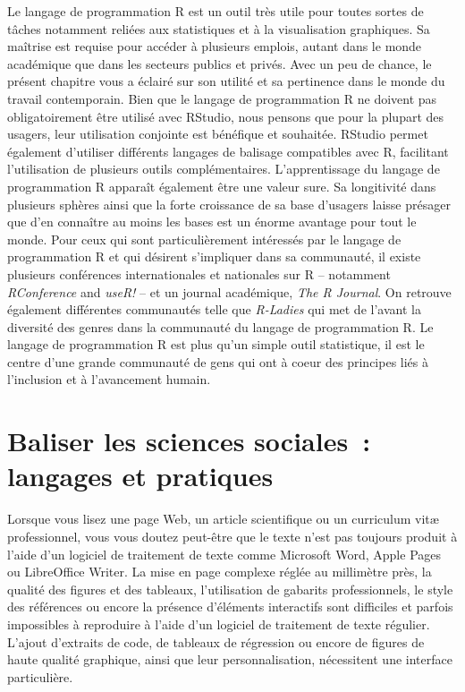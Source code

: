 \documentclass[
  letterpaper,
]{scrbook}
\begin{document}
Le langage de programmation R est un outil très utile pour toutes sortes
de tâches notamment reliées aux statistiques et à la visualisation
graphiques. Sa maîtrise est requise pour accéder à plusieurs emplois,
autant dans le monde académique que dans les secteurs publics et privés.
Avec un peu de chance, le présent chapitre vous a éclairé sur son
utilité et sa pertinence dans le monde du travail contemporain. Bien que
le langage de programmation R ne doivent pas obligatoirement être
utilisé avec RStudio, nous pensons que pour la plupart des usagers, leur
utilisation conjointe est bénéfique et souhaitée. RStudio permet
également d'utiliser différents langages de balisage compatibles avec R,
facilitant l'utilisation de plusieurs outils complémentaires.
L'apprentissage du langage de programmation R apparaît également être
une valeur sure. Sa longitivité dans plusieurs sphères ainsi que la
forte croissance de sa base d'usagers laisse présager que d'en connaître
au moins les bases est un énorme avantage pour tout le monde. Pour ceux
qui sont particulièrement intéressés par le langage de programmation R
et qui désirent s'impliquer dans sa communauté, il existe plusieurs
conférences internationales et nationales sur R -- notamment
\emph{RConference} and \emph{useR!} -- et un journal académique,
\emph{The R Journal}. On retrouve également différentes communautés
telle que \emph{R-Ladies} qui met de l'avant la diversité des genres
dans la communauté du langage de programmation R. Le langage de
programmation R est plus qu'un simple outil statistique, il est le
centre d'une grande communauté de gens qui ont à coeur des principes
liés à l'inclusion et à l'avancement humain.


\hypertarget{sec-chap5}{%
\chapter{Baliser les sciences sociales~: langages et
pratiques}\label{sec-chap5}}

Lorsque vous lisez une page Web, un article scientifique ou un
curriculum vitæ professionnel, vous vous doutez peut-être que le texte
n'est pas toujours produit à l'aide d'un logiciel de traitement de texte
comme Microsoft Word, Apple Pages ou LibreOffice Writer. La mise en page
complexe réglée au millimètre près, la qualité des figures et des
tableaux, l'utilisation de gabarits professionnels, le style des
références ou encore la présence d'éléments interactifs sont difficiles
et parfois impossibles à reproduire à l'aide d'un logiciel de traitement
de texte régulier. L'ajout d'extraits de code, de tableaux de régression
ou encore de figures de haute qualité graphique, ainsi que leur
personnalisation, nécessitent une interface particulière.
\end{document}

